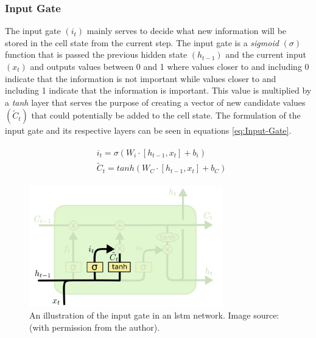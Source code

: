 \subsubsection{Input Gate}
\label{subsubsec:Background-Information:Long-Short-Term-Memory-Networks:Input-Gate}
The input gate $(i_t)$ mainly serves to decide what new information will be stored in the cell state from the current step. The input gate is a \textit{sigmoid} $(\sigma)$ function that is passed the previous hidden state $(h_{t-1})$ and the current input $(x_t)$ and outputs values between 0 and 1 where values closer to and including 0 indicate that the information is not important while values closer to and including 1 indicate that the information is important. This value is multiplied by a \textit{tanh} layer that serves the purpose of creating a vector of new candidate values $(\tilde{C}_t)$ that could potentially be added to the cell state. The formulation of the input gate and its respective layers can be seen in equations \ref{eq:Input-Gate}.

\begin{align}
    \begin{split}
        & i_t = \sigma (W_i \cdot \left[h_{t-1}, x_t \right] + b_i) \\
        & \tilde{C}_t = tanh (W_C \cdot \left[h_{t-1}, x_t \right] + b_C)
    \end{split}
\label{eq:Input-Gate}
\end{align}

\begin{figure}[hbt!]
    \centering
    \includegraphics[width=0.75\textwidth]{Images/Chapter 3/LSTM/LSTM-Input-Gate-Illustration.png}
    \caption{An illustration of the input gate in an \gls{lstm} network. Image source: \cite{Colah} (with permission from the author).}
    \label{fig:LSTM-Input-Gate-Illustration}
\end{figure}

